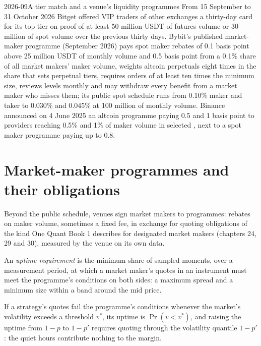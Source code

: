 \begin{dated}{2026-09}{A tier match and a venue's liquidity programmes}\label{dat:m3:getting-access-crypto-venues:programmes}
From 15 September to 31 October 2026 Bitget offered VIP traders of other exchanges a thirty-day card for its top tier on proof of at least
50 million USDT of futures volume or 30 million of spot volume over the previous thirty days. Bybit's published market-maker programme
(September 2026) pays spot maker rebates of 0.1 basis point above 25 million USDT of monthly volume and 0.5 basis point from a 0.1\% share of
all market makers' maker volume, weights altcoin perpetuals eight times in the share that sets perpetual tiers, requires orders of at least ten
times the minimum size, reviews levels monthly and may withdraw every benefit from a market maker who misses them; its public spot schedule
runs from 0.10\% maker and taker to 0.030\% and 0.045\% at 100 million of monthly volume. Binance announced on 4 June 2025 an altcoin programme
paying 0.5 and 1 basis point to providers reaching 0.5\% and 1\% of maker volume in selected , next to a spot maker programme paying up to 0.8.
\end{dated}

\section{Market-maker programmes and their obligations}

Beyond the public schedule, venues sign market makers to programmes: rebates on maker volume, sometimes a fixed fee, in exchange for quoting
obligations of the kind One Quant Book 1 describes for designated market makers (chapters 24, 29 and 30), measured by the venue on its own data.

\begin{definition}\label{def:m3:getting-access-crypto-venues:uptime}
An \emph{uptime requirement} is the minimum share of sampled moments, over a measurement period, at which a market maker's
quotes in an instrument must meet the programme's conditions on both sides: a maximum spread and a minimum size within a band around the mid price.
\end{definition}

\begin{proposition}\label{prop:m3:getting-access-crypto-venues:tails}
If a strategy's quotes fail the programme's conditions whenever the market's volatility exceeds a threshold $v^*$, its uptime is
$\Pr(v < v^*)$, and raising the uptime from $1 - p$ to $1 - p'$ requires quoting through the volatility quantile $1 - p'$: the quiet hours
contribute nothing to the margin.
\end{proposition}

